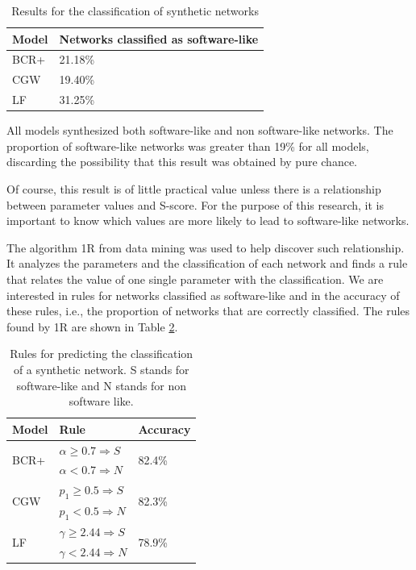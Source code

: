 \begin{table}
\caption{Results for the classification of synthetic networks}
\centering
\begin{tabular}{|l|l|}
\hline
Model & Networks classified as software-like \\
\hline 
\hline
BCR+ & 21.18\% \\ %
\hline
CGW  & 19.40\% \\  %
\hline
LF   & 31.25\% \\ %
\hline
\end{tabular}
\label{tab:results}
\end{table}

All models synthesized both software-like and non software-like networks. The
proportion of software-like networks was greater than 19\% for all models,
discarding the possibility that this result was obtained by pure chance.

%
%
%
%

Of course, this result is of little practical value unless there is a
relationship between parameter values and S-score. For the purpose of this
research, it is important to know which values are more likely to lead to
software-like networks.

The algorithm 1R from data mining was used to help discover such relationship.
It analyzes the parameters and the classification of each network and finds a
rule that relates the value of one single parameter with the classification. We
are interested in rules for networks classified as software-like and in the
accuracy of these rules, i.e., the proportion of networks that are correctly
classified. The rules found by 1R are shown in Table \ref{tab:rules}.

\begin{table}
\caption{Rules for predicting the classification of a synthetic network. S
stands for software-like and N stands for non software like.}
\centering
\begin{tabular}{|l|l|l|}
\hline
Model & Rule & Accuracy \\
\hline 
\hline
\multirow{2}{*}{BCR+}
     & $\alpha \ge 0.7 \Rightarrow S$ & \multirow{2}{*}{82.4\%}  \\ 
     & $\alpha < 0.7 \Rightarrow N$ & \\ 
\hline
\multirow{2}{*}{CGW}
     & $p_1 \ge 0.5 \Rightarrow S$ & \multirow{2}{*}{82.3\%} \\  
     & $p_1 < 0.5 \Rightarrow N$ & \\  
\hline
\multirow{2}{*}{LF}   
     & $\gamma \ge 2.44 \Rightarrow S$ & \multirow{2}{*}{78.9\%} \\ 
     & $\gamma < 2.44 \Rightarrow N$ & \\ 
\hline
\end{tabular}
\label{tab:rules}
\end{table}

